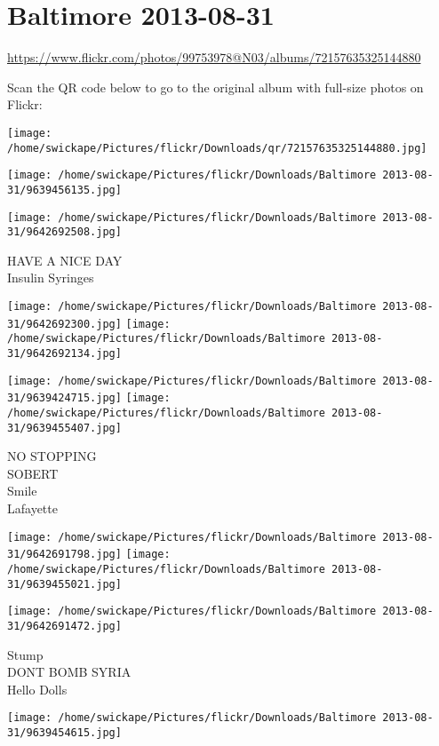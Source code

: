 \documentclass[10pt,letterpaper]{article}
\title{}
\author{}
\date{}
\begin{document}
\section*{Baltimore 2013-08-31}

\url{https://www.flickr.com/photos/99753978@N03/albums/72157635325144880}

Scan the QR code below to go to the original album with full-size photos on Flickr:

\texttt{[image: /home/swickape/Pictures/flickr/Downloads/qr/72157635325144880.jpg]}
\pagebreak

\texttt{[image: /home/swickape/Pictures/flickr/Downloads/Baltimore 2013-08-31/9639456135.jpg]}

\vspace{0.25in}
\texttt{[image: /home/swickape/Pictures/flickr/Downloads/Baltimore 2013-08-31/9642692508.jpg]}

HAVE A NICE DAY\\
Insulin Syringes
\pagebreak

\texttt{[image: /home/swickape/Pictures/flickr/Downloads/Baltimore 2013-08-31/9642692300.jpg]}
\texttt{[image: /home/swickape/Pictures/flickr/Downloads/Baltimore 2013-08-31/9642692134.jpg]}

\texttt{[image: /home/swickape/Pictures/flickr/Downloads/Baltimore 2013-08-31/9639424715.jpg]}
\texttt{[image: /home/swickape/Pictures/flickr/Downloads/Baltimore 2013-08-31/9639455407.jpg]}

NO STOPPING\\
SOBERT\\
Smile\\
Lafayette
\pagebreak

\texttt{[image: /home/swickape/Pictures/flickr/Downloads/Baltimore 2013-08-31/9642691798.jpg]}
\texttt{[image: /home/swickape/Pictures/flickr/Downloads/Baltimore 2013-08-31/9639455021.jpg]}

\texttt{[image: /home/swickape/Pictures/flickr/Downloads/Baltimore 2013-08-31/9642691472.jpg]}

Stump\\
DONT BOMB SYRIA\\
Hello Dolls
\pagebreak

\texttt{[image: /home/swickape/Pictures/flickr/Downloads/Baltimore 2013-08-31/9639454615.jpg]}
\end{document}
